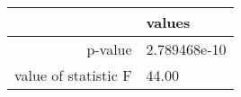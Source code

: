 \begin{tabular}{|r|l|}
  \hline
    & values \\
  \hline
  p-value & 2.789468e-10 \\
  \hline
  value of statistic F & 44.00 \\
  \hline
\end{tabular}
